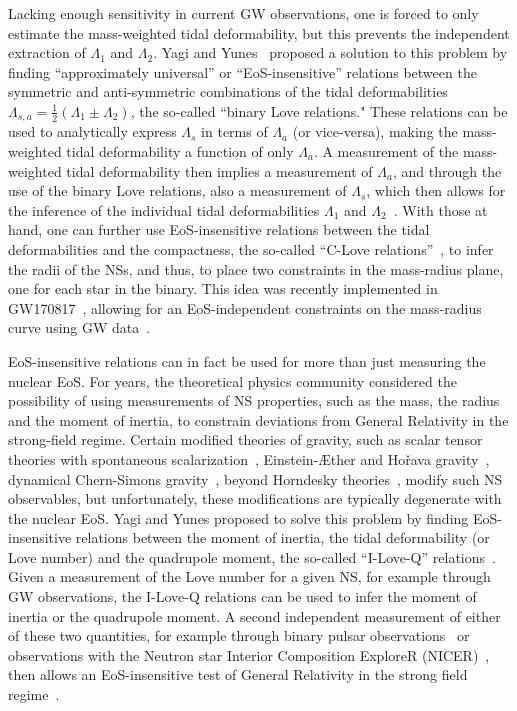\documentclass[prd,twocolumn,nofootinbib,superscriptaddress,amsmath,amssymb]{revtex4-1}
\begin{document}
Lacking enough sensitivity in current GW observations, one is forced to only estimate the mass-weighted tidal deformability, but this prevents the independent extraction of $\Lambda_{1}$ and $\Lambda_{2}$. Yagi and Yunes~\cite{Yagi:2015pkc,Yagi:binLove} proposed a solution to this problem by finding ``approximately universal'' or ``EoS-insensitive'' relations between the symmetric and anti-symmetric combinations of the tidal deformabilities $\Lambda_{s,a}=\frac{1}{2}(\Lambda_1 \pm \Lambda_2)$, the so-called ``binary Love relations." These relations can be used to analytically express $\Lambda_{s}$ in terms of $\Lambda_{a}$ (or vice-versa), making the mass-weighted tidal deformability a function of only $\Lambda_{a}$. A measurement of the mass-weighted tidal deformability then implies a measurement of $\Lambda_{a}$, and through the use of the binary Love relations, also a measurement of $\Lambda_{s}$, which then allows for the inference of the individual tidal deformabilities $\Lambda_{1}$ and $\Lambda_{2}$~\cite{Yagi:2015pkc,Yagi:binLove}. With those at hand, one can further use EoS-insensitive relations between the tidal deformabilities and the compactness, the so-called ``C-Love relations''~\cite{Yagi:2013bca,Yagi:ILQ,Maselli:2013mva,Yagi:2016bkt}, to infer the radii of the NSs, and thus, to place two constraints in the mass-radius plane, one for each star in the binary. This idea was recently implemented in GW170817~\cite{TheLIGOScientific:2017qsa}, allowing for an EoS-independent constraints on the mass-radius curve using GW data~\cite{Katerina:residuals,LIGO:posterior}.     

EoS-insensitive relations can in fact be used for more than just measuring the nuclear EoS. For years, the theoretical physics community considered the possibility of using measurements of NS properties, such as the mass, the radius and the moment of inertia, to constrain deviations from General Relativity in the strong-field regime. Certain modified theories of gravity, such as scalar tensor theories with spontaneous scalarization~\cite{Damour:1996ke}, Einstein-\AE ther and Ho\v rava gravity~\cite{Eling:2007xh,Yagi:2013ava,Yagi:2013qpa}, dynamical Chern-Simons gravity~\cite{Yunes:2009ch,Yagi:2013mbt,Gupta:2017vsl}, beyond Horndesky theories~\cite{Babichev:2016jom,Sakstein:2016oel}, modify such NS observables, but unfortunately, these modifications are typically degenerate with the nuclear EoS. Yagi and Yunes proposed to solve this problem by finding EoS-insensitive relations between the moment of inertia, the tidal deformability (or Love number) and the quadrupole moment, the so-called ``I-Love-Q'' relations~\cite{Yagi:2013bca,Yagi:ILQ}. Given a measurement of the Love number for a given NS, for example through GW observations, the I-Love-Q relations can be used to infer the moment of inertia or the quadrupole moment. A second independent measurement of either of these two quantities, for example through binary pulsar observations~\cite{Lattimer:2004nj} or observations with the Neutron star Interior Composition ExploreR (NICER)~\cite{Ozel:2015ykl}, then allows an EoS-insensitive test of General Relativity in the strong field regime~\cite{Yagi:2013bca,Yagi:ILQ,Gupta:2017vsl,Doneva:2017jop}. 
\end{document}
